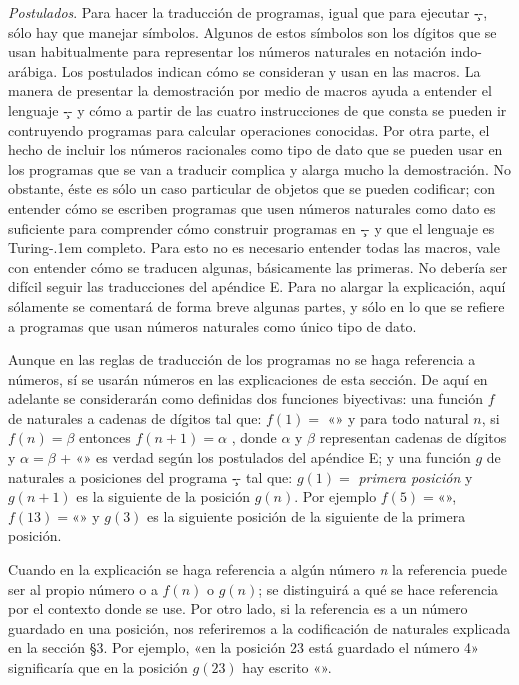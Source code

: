{\it Postulados}. Para hacer la traducción de programas, igual que para ejecutar \c--, sólo hay que
manejar símbolos. Algunos de estos símbolos son los dígitos que se usan habitualmente para
representar los números naturales en notación indo-arábiga. Los postulados indican cómo se consideran
y usan en las macros.
\finlista
{}%
La manera de presentar la demostración por medio de macros ayuda a entender el lenguaje \c-- y cómo
a partir de las cuatro instrucciones de que consta se pueden ir contruyendo programas para calcular
operaciones conocidas. Por otra parte, el hecho de incluir los números racionales como tipo de dato
que se pueden usar en los programas que se van a traducir complica y alarga mucho la
demostración. No obstante, éste es sólo un caso particular de objetos que se pueden codificar; con
entender cómo se escriben programas que usen números naturales como dato es suficiente para
comprender cómo construir programas en \c-- y que el lenguaje es Turing-\kern.1em completo. Para
esto no es necesario entender todas las macros, vale con entender cómo se traducen algunas,
básicamente las primeras. No debería ser difícil seguir las traducciones del apéndice E. Para no
alargar la explicación, aquí sólamente se comentará de forma breve algunas partes, y sólo en lo que
se refiere a programas que usan números naturales como único tipo de dato.

Aunque en las reglas de traducción de los programas no se haga referencia a números, sí se usarán
números en las explicaciones de esta sección. De aquí en adelante se considerarán como definidas dos
funciones biyectivas: una función $ f $ de naturales a cadenas de dígitos tal que: $ f(1)= $
«» y para todo natural $ n $, si $ f(n)=\beta $ entonces $ f(n+1)=\alpha $ , donde
$ \alpha $ y $ \beta $ representan cadenas de dígitos y $ \alpha = \beta $ + «» es verdad
según los postulados del apéndice E; y una función $ g $ de naturales a posiciones del programa \c--
tal que: $ g(1)= $ {\it primera posición} y $ g(n+1)$ es la siguiente de la posición $ g(n)$. Por
ejemplo $ f(5)= $«{}», $ f(13)=$«{}» y $g(3)$ es la siguiente posición de la
siguiente de la primera posición.

Cuando en la explicación se haga referencia a algún número {\it n} la referencia puede ser al propio
número o a $f(n)$ o $g(n)$; se distinguirá a qué se hace referencia por el contexto donde se
use. Por otro lado, si la referencia es a un número guardado en una posición, nos referiremos a la
codificación de naturales explicada en la sección §3. Por ejemplo, «en la posición 23 está
guardado el número 4» significaría que en la posición $g(23)$ hay escrito «».

